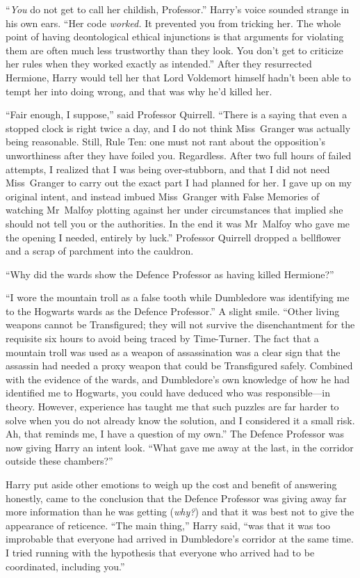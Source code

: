 “\emph{You} do not get to call her childish, Professor.” Harry’s voice sounded
strange in his own ears. “Her code \emph{worked.} It prevented you from
tricking her. The whole point of having deontological ethical injunctions is
that arguments for violating them are often much less trustworthy than they
look. You don’t get to criticize her rules when they worked exactly as
intended.” After they resurrected Hermione, Harry would tell her that Lord
Voldemort himself hadn’t been able to tempt her into doing wrong, and that was
why he’d killed her.

“Fair enough, I suppose,” said Professor Quirrell. “There is a saying that even
a stopped clock is right twice a day, and I do not think Miss~Granger was
actually being reasonable. Still, Rule Ten: one must not rant about the
opposition’s unworthiness after they have foiled you. Regardless. After two
full hours of failed attempts, I realized that I was being over-stubborn, and
that I did not need Miss~Granger to carry out the exact part I had planned for
her. I gave up on my original intent, and instead imbued Miss~Granger with
False Memories of watching Mr~Malfoy plotting against her under circumstances
that implied she should not tell you or the authorities. In the end it was
Mr~Malfoy who gave me the opening I needed, entirely by luck.” Professor
Quirrell dropped a bellflower and a scrap of parchment into the cauldron.

“Why did the wards show the Defence Professor as having killed Hermione?”

“I wore the mountain troll as a false tooth while Dumbledore was identifying me
to the Hogwarts wards as the Defence Professor.” A slight smile. “Other living
weapons cannot be Transfigured; they will not survive the disenchantment for
the requisite six hours to avoid being traced by Time-Turner. The fact that a
mountain troll was used as a weapon of assassination was a clear sign that the
assassin had needed a proxy weapon that could be Transfigured safely. Combined
with the evidence of the wards, and Dumbledore’s own knowledge of how he had
identified me to Hogwarts, you could have deduced who was responsible—in
theory. However, experience has taught me that such puzzles are far harder to
solve when you do not already know the solution, and I considered it a small
risk. Ah, that reminds me, I have a question of my own.” The Defence Professor
was now giving Harry an intent look. “What gave me away at the last, in the
corridor outside these chambers?”

Harry put aside other emotions to weigh up the cost and benefit of answering
honestly, came to the conclusion that the Defence Professor was giving away far
more information than he was getting (\emph{why?}) and that it was best not to
give the appearance of reticence. “The main thing,” Harry said, “was that it
was too improbable that everyone had arrived in Dumbledore’s corridor at the
same time. I tried running with the hypothesis that everyone who arrived had to
be coordinated, including you.”

